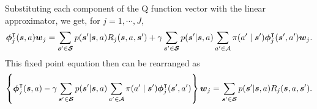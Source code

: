 Substituting each component of the Q function vector with the linear approximator, we get, for $j = 1, \cdots, J$,
$$\boldsymbol{\phi}_j^\intercal(\boldsymbol{s},a)\boldsymbol{w}_j  =\sum_{\boldsymbol{s}^{\prime} \in \boldsymbol{\mathcal{S}}}  p(\boldsymbol{s}^{\prime} | \boldsymbol{s}, a)  R_j(\boldsymbol{s}, a, \boldsymbol{s}^{\prime}) + \gamma \sum_{\boldsymbol{s}^{\prime} \in \boldsymbol{\mathcal{S}}}  p(\boldsymbol{s}^{\prime} | \boldsymbol{s}, a)  \sum_{a^{\prime} \in \mathcal{A}} \pi(a^{\prime} \mid \boldsymbol{s}^{\prime} )  \boldsymbol{\phi}_j^\intercal(\boldsymbol{s}^{\prime}, a^{\prime})\boldsymbol{w}_j.$$
This fixed point equation then can be rearranged as
\begin{equation}
\begin{gathered}
 \left\{\boldsymbol{\phi}_j^\intercal(\boldsymbol{s},a) - \gamma \sum_{\boldsymbol{s}^{\prime} \in \boldsymbol{\mathcal{S}}}  p(\boldsymbol{s}^{\prime} | \boldsymbol{s}, a)  \sum_{a^{\prime} \in \mathcal{A}} \pi(a^{\prime} \mid \boldsymbol{s}^{\prime} )  \boldsymbol{\phi}_j^\intercal(\boldsymbol{s}^{\prime}, a^{\prime})\right\}\boldsymbol{w}_j =\sum_{\boldsymbol{s}^{\prime} \in \boldsymbol{\mathcal{S}}}  p(\boldsymbol{s}^{\prime} | \boldsymbol{s}, a) R_j(\boldsymbol{s}, a, \boldsymbol{s}^{\prime}).
 \end{gathered}
\end{equation}

